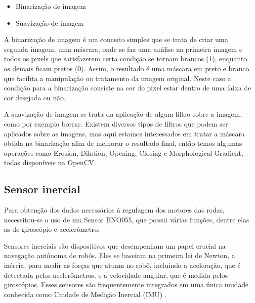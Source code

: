 \begin{itemize}
    \item Binarização de imagem
    \item Suavização de imagem
\end{itemize}

A binarização de imagem é um conceito simples que se trata de criar uma segunda imagem, uma máscara, onde se faz uma análise na primeira imagem e todos os pixels que satisfazerem certa condição se tornam brancos (1), enquanto os demais ficam pretos (0). Assim, o resultado é uma máscara em preto e branco que facilita a manipulação ou tratamento da imagem original. Neste caso a condição para a binarização consiste na cor do pixel estar dentro de uma faixa de cor desejada ou não.

A suavização de imagem se trata da aplicação de algum filtro sobre a imagem, como por exemplo borrar. Existem diversos tipos de filtros que podem ser aplicados sobre as imagens, mas aqui estamos interessados em tratar a máscara obtida na binarização afim de melhorar o resultado final, então temos algumas operações como Erosion, Dilation, Opening, Closing e Morphological Gradient, todas disponíveis na OpenCV.


\subsection{Sensor inercial}

Para obtenção dos dados necessários à regulagem dos motores das rodas, necessitou-se o uso de um Sensor BNO055, que possui várias funções, dentre elas as de giroscópio e acelerômetro.

Sensores inerciais são dispositivos que desempenham um papel crucial na navegação autônoma de robôs. Eles se baseiam na primeira lei de Newton, a inércia, para medir as forças que atuam no robô, incluindo a aceleração, que é detectada pelos acelerômetros, e a velocidade angular, que é medida pelos giroscópios. Esses sensores são frequentemente integrados em uma única unidade conhecida como Unidade de Medição Inercial (IMU) \cite{Groves2013}.

